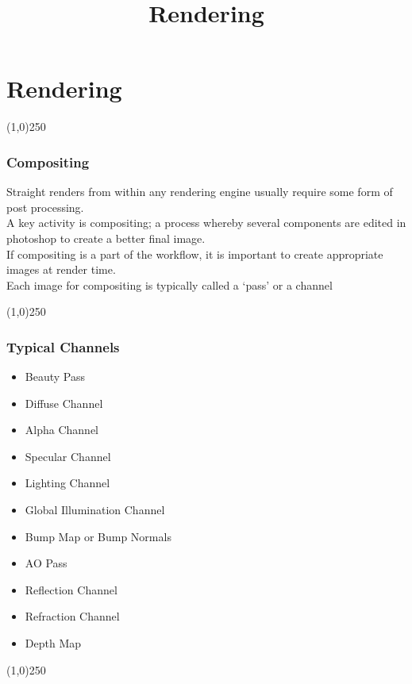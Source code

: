 \section{Rendering}
\begin{frame}
\title[Rendering]{Rendering}
\titlepage
\end{frame}\begin{center}\line(1,0){250}\end{center}


\begin{frame}
	\frametitle{Compositing}
	Straight renders from within any rendering engine usually require some form of post processing.\\
	A key activity is compositing; a process whereby several components are edited in photoshop to create a better final image.\\
	If compositing is a part of the workflow, it is important to create appropriate images at render time.\\
	Each image for compositing is typically called a `pass' or a channel
	
\end{frame}
\begin{center}\line(1,0){250}\end{center}


\begin{frame}
	\frametitle{Typical Channels}
	\begin{itemize}
		\item Beauty Pass
		\item Diffuse Channel
		\item Alpha Channel
		\item Specular Channel
		\item Lighting Channel
		\item Global Illumination Channel
		\item Bump Map or Bump Normals
		\item AO Pass
		\item Reflection Channel
		\item Refraction Channel
		\item Depth Map
	\end{itemize}
\end{frame}
\begin{center}\line(1,0){250}\end{center}




